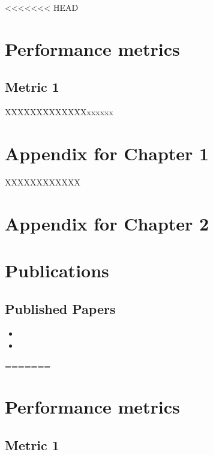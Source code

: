 <<<<<<< HEAD

\inbpdocument



\chapter{Performance metrics}
\label{ch:appendix:pmetrics}

\section{Metric 1}

XXXXXXXXXXXXXxxxxxx



\chapter{Appendix for Chapter 1}

XXXXXXXXXXXX

\chapter{Appendix for Chapter 2}


\chapter{Publications}

\section{Published Papers}

\begin{itemize}
	\item {}
	\item {}
\end{itemize}






=======

\inbpdocument



\chapter{Performance metrics}
\label{ch:appendix:pmetrics}

\section{Metric 1}

